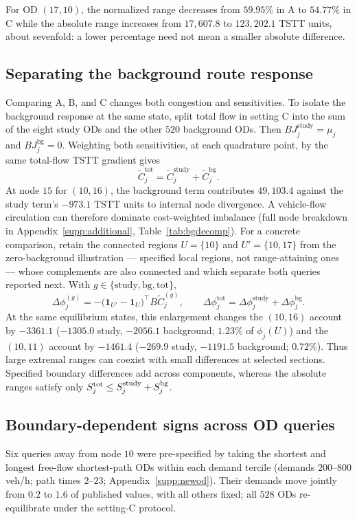 For OD $(17,10)$, the normalized range decreases from
$59.95\%$ in A to $54.77\%$ in C while the absolute range increases
from $17{,}607.8$ to $123{,}202.1$ TSTT units, about sevenfold: a lower percentage need not mean a smaller absolute
difference.

\subsection{Separating the background route response}\label{subsec:bgsplit}
Comparing A, B, and C changes both congestion and sensitivities. To isolate
the background response at the same state, split total flow in setting C
into the sum of the eight study ODs and the other $520$ background ODs.
Then $BJ_j^{\mathrm{study}}=\mu_j$ and $BJ_j^{\mathrm{bg}}=0$.
Weighting both sensitivities, at each quadrature point, by the same
total-flow TSTT gradient gives
\begin{equation}
\widetilde C_j^{\mathrm{tot}}
=\widetilde C_j^{\mathrm{study}}+\widetilde C_j^{\mathrm{bg}}.
\label{eq:bg_attribution}
\end{equation}
At node $15$ for $(10,16)$, the background term contributes
$49{,}103.4$ against the study term's $-973.1$ TSTT units to internal
node divergence. A vehicle-flow circulation can therefore dominate
cost-weighted imbalance (full node breakdown in
Appendix~\ref{supp:additional}, Table~\ref{tab:bgdecomp}).
For a concrete comparison, retain the connected regions $U=\{10\}$
and $U'=\{10,17\}$ from the zero-background illustration --- specified
local regions, not range-attaining ones --- whose complements are also
connected and which separate both queries reported next. With
$g\in\{\mathrm{study},\mathrm{bg},\mathrm{tot}\}$,
\[
\Delta\phi_j^{(g)}
=-\bigl(\mathbf1_{U'}-\mathbf1_U\bigr)^\top B\widetilde C_j^{(g)},
\qquad
\Delta\phi_j^{\mathrm{tot}}=\Delta\phi_j^{\mathrm{study}}+\Delta\phi_j^{\mathrm{bg}}.
\]
At the same equilibrium states, this enlargement changes the $(10,16)$
account by $-3361.1$ ($-1305.0$ study, $-2056.1$ background; $1.23\%$
of $\phi_j(U)$) and the $(10,11)$ account by $-1461.4$ ($-269.9$
study, $-1191.5$ background; $0.72\%$). Thus large extremal ranges
can coexist with small differences at selected sections.
Specified boundary differences add across components, whereas the
absolute ranges satisfy only
$S_j^{\rm tot}\le S_j^{\rm study}+S_j^{\rm bg}$.

\subsection{Boundary-dependent signs across OD queries}\label{subsec:newod}
Six queries away from node $10$ were pre-specified by taking the
shortest and longest free-flow shortest-path ODs within each demand
tercile (demands $200$--$800$ veh/h; path times $2$--$23$;
Appendix~\ref{supp:newod}). Their demands move jointly from $0.2$ to
$1.6$ of published values, with all others fixed; all $528$ ODs
re-equilibrate under the setting-C protocol.

